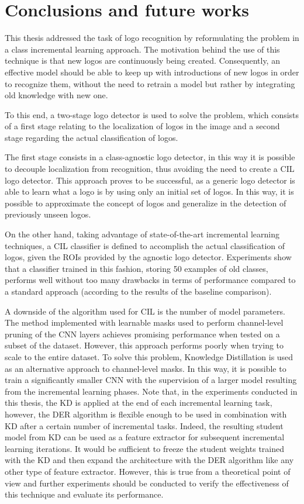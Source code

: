 \chapter{Conclusions and future works}
\label{chap:conclusions}

This thesis addressed the task of logo recognition by reformulating the problem in a class incremental learning approach.
The motivation behind the use of this technique is that new logos are continuously being created.
Consequently, an effective model should be able to keep up with introductions of new logos in order to recognize them, without the need to retrain a model but rather by integrating old knowledge with new one.

To this end, a two-stage logo detector is used to solve the problem, which consists of a first stage relating to the localization of logos in the image and a second stage regarding the actual classification of logos.

The first stage consists in a class-agnostic logo detector, in this way it is possible to decouple localization from recognition, thus avoiding the need to create a CIL logo detector. 
This approach proves to be successful, as a generic logo detector is able to learn what a logo is by using only an initial set of logos.
In this way, it is possible to approximate the concept of logos and generalize in the detection of previously unseen logos.

On the other hand, taking advantage of state-of-the-art incremental learning techniques, a CIL classifier is defined to accomplish the actual classification of logos, given the ROIs provided by the agnostic logo detector.
Experiments show that a classifier trained in this fashion, storing 50 examples of old classes, performs well without too many drawbacks in terms of performance compared to a standard approach (according to the results of the baseline comparison).

A downside of the algorithm used for CIL is the number of model parameters.
The method implemented with learnable masks used to perform channel-level pruning of the CNN layers achieves promising performance when tested on a subset of the dataset.
However, this approach performs poorly when trying to scale to the entire dataset.
To solve this problem, Knowledge Distillation is used as an alternative approach to channel-level masks.
In this way, it is possible to train a significantly smaller CNN with the supervision of a larger model resulting from the incremental learning phases.
Note that, in the experiments conducted in this thesis, the KD is applied at the end of each incremental learning task, however, the DER algorithm is flexible enough to be used in combination with KD after a certain number of incremental tasks.
Indeed, the resulting student model from KD can be used as a feature extractor for subsequent incremental learning iterations.
It would be sufficient to freeze the student weights trained with the KD and then expand the architecture with the DER algorithm like any other type of feature extractor.
However, this is true from a theoretical point of view and further experiments should be conducted to verify the effectiveness of this technique and evaluate its performance.


